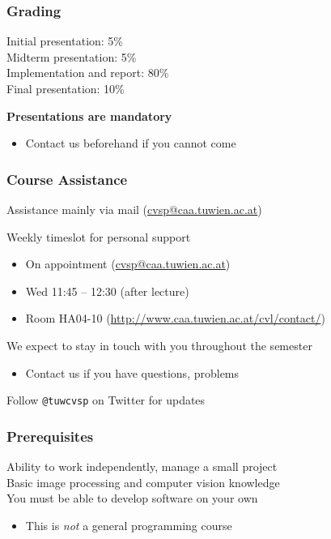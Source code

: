 \documentclass[xetex,professionalfont]{beamer}
\newcommand{\highlight}[1]{\textcolor{tuwcvl_inf_red}{\textbf{#1}}}
\begin{document}

\begin{frame}
\frametitle{Grading}

Initial presentation: 5\% \\\medskip
Midterm presentation: 5\% \\\medskip
Implementation and report: 80\% \\\medskip
Final presentation: 10\%

\bigskip
\highlight{Presentations are mandatory}
\begin{itemize}
	\item Contact us beforehand if you cannot come
\end{itemize}

\end{frame}


\begin{frame}
\frametitle{Course Assistance}

Assistance mainly via mail (\url{cvsp@caa.tuwien.ac.at})

\bigskip
Weekly timeslot for personal support
\begin{itemize}
	\item On appointment (\url{cvsp@caa.tuwien.ac.at})
	\item Wed 11:45 -- 12:30 (after lecture)
	\item Room HA04-10 (\url{http://www.caa.tuwien.ac.at/cvl/contact/})
\end{itemize}

\bigskip
We expect to stay in touch with you throughout the semester
\begin{itemize}
	\item Contact us if you have questions, problems
\end{itemize}

\bigskip
Follow \texttt{@tuwcvsp} on Twitter for updates

\end{frame}


\begin{frame}
\frametitle{Prerequisites}

Ability to work independently, manage a small project\\\medskip
Basic image processing and computer vision knowledge\\\medskip
You must be able to develop software on your own
\begin{itemize}
	\item This is \emph{not} a general programming course
\end{itemize}

\end{frame}
\end{document}
